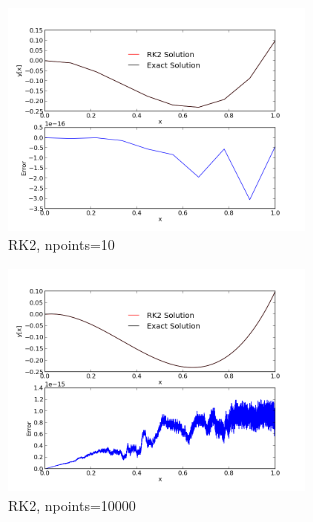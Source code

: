 \documentclass[11pt,letterpaper]{article}
\begin{document}
\begin{figure}[bth]
\centering
\includegraphics[width=0.7\textwidth]{ws102a.png}
\caption{RK2, npoints=10}
\label{fig:3}
\end{figure}

\begin{figure}[bth]
\centering
\includegraphics[width=0.7\textwidth]{ws102b.png}
\caption{RK2, npoints=10000}
\label{fig:4}
\end{figure}
\end{document}

